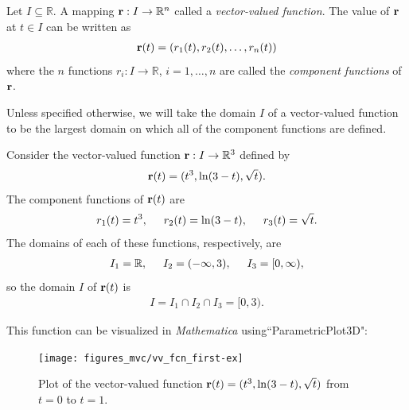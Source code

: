 \documentclass[12pt,letterpaper,reqno]{article}
\numberwithin{equation}{section}
\newcommand{\R}{\ensuremath{\mathbb R}}
\newcommand{\bbr}{{\bf r}}
\begin{document}
{\begin{defn}
Let $I \subseteq \R$. A mapping $\bbr:I \to \mathbb{R}^n$ called a \emph{vector-valued function}. The value of $\bbr$ at $t \in I$ can be written as
\begin{align*}
	\bbr(t)=(r_1(t),r_2(t),\dots,r_n(t))
\end{align*}
where the $n$ functions $r_i:I \to \R$, $i=1,\dots,n$ are called the \emph{component functions} of $\bbr$.	
\end{defn}
Unless specified otherwise, we will take the domain $I$ of a vector-valued function to be the largest domain on which all of the component functions are defined.
\begin{example}
Consider the vector-valued function $\bbr:I \to \mathbb{R}^3$ defined by
	\begin{align*}
		\bbr(t)=(t^3,\ln(3-t),\sqrt{t}).
	\end{align*}
The component functions of $\bbr(t)$ are 
\begin{align*}
	r_1(t)=t^3, \hspace{0.5cm} r_2(t)=\ln(3-t), \hspace{0.5cm} r_3(t)=\sqrt{t}.
\end{align*}
The domains of each of these functions, respectively, are 
\begin{align*}
	I_1=\R, \hspace{0.5cm} I_2=(-\infty,3), \hspace{0.5cm} I_3=[0,\infty),
\end{align*}	
so the domain $I$ of $\bbr(t)$ is 
\begin{align*}
	I=I_1 \cap I_2 \cap I_3=[0,3).
\end{align*} 
\end{example}
This function can be visualized in \emph{Mathematica} using``ParametricPlot3D":

\begin{figure}[h]
	\begin{center}
		\texttt{[image: figures\_mvc/vv\_fcn\_first-ex]}
	\end{center}
	\caption{Plot of the vector-valued function $\bbr(t)=(t^3,\ln(3-t),\sqrt{t})$ from $t=0$ to $t=1$.}
\end{figure}

}
\end{document}
